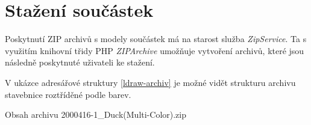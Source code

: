 \section{Stažení součástek}
Poskytnutí ZIP archivů s modely součástek má na starost služba \textit{ZipService}. Ta s využitím knihovní třidy PHP \textit{ZIPArchive} umožňuje vytvoření archivů, které jsou následně poskytnuté uživateli ke stažení. 

V ukázce adresářové struktury \ref{ldraw-archiv} je možné vidět strukturu archivu stavebnice roztříděné podle barev.

\begin{dirfigure}%
    \caption{Obsah archivu 2000416-1\_Duck(Multi-Color).zip}\label{ldraw-archiv}
\end{dirfigure}